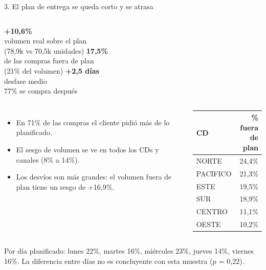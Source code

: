 \documentclass[aspectratio=169,10pt]{beamer}
\newcommand{\dato}[2]{{\Large\bfseries\color{acento}#1}\\[-0.2em]{\footnotesize\color{gris}#2}}
\begin{document}
\begin{frame}{3. El plan de entrega se queda corto y se atrasa}
\begin{columns}[T]
\dato{+10,6\%}{volumen real sobre el plan\\(78,9k vs 70,5k unidades)}
\dato{17,5\%}{de las compras fuera de plan\\(21\% del volumen)}
\dato{+2,5 días}{desfase medio\\77\% se compra después}
\end{columns}
\vspace{0.8em}
\begin{columns}[T]
\begin{itemize}
\item En 71\% de las compras el cliente pidió más de lo planificado.
\item El sesgo de volumen se ve en todos los CDs y canales (8\% a 14\%).
\item Los desvíos son más grandes: el volumen fuera de plan tiene un sesgo de +16,9\%.
\end{itemize}
\begin{center}
\begin{tabular}{lr}
\toprule
CD & \% fuera de plan \\
\midrule
NORTE & 24,4\% \\
PACIFICO & 21,3\% \\
ESTE & 19,5\% \\
SUR & 18,9\% \\
CENTRO & 11,1\% \\
OESTE & 10,2\% \\
\bottomrule
\end{tabular}
\end{center}
\end{columns}
\vspace{0.3em}
{\footnotesize\color{gris} Por día planificado: lunes 22\%, martes 16\%, miércoles 23\%, jueves 14\%, viernes 16\%. La diferencia entre días no es concluyente con esta muestra (p = 0,22).}
\end{frame}
\end{document}
